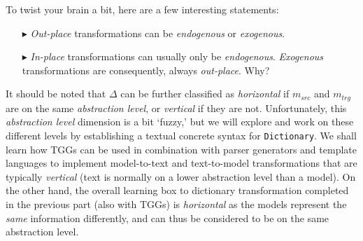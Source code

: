 To twist your brain a bit, here are a few interesting statements:
\begin{enumerate}

\item[$\blacktriangleright$] \emph{Out-place} transformations can be \emph{endogenous} or \emph{exogenous}.

\item[$\blacktriangleright$] \emph{In-place} transformations can usually only be \emph{endogenous}. \emph{Exo\-gen\-ous} transformations are consequently,
always \emph{out-place}.  Why?

\end{enumerate}  

It should be noted that $\Delta$ can be further classified as \emph{horizontal} if $m_{src}$ and $m_{trg}$ are on the same \emph{abstraction level}, or
\emph{vertical} if they are not. Unfortunately, this \emph{abstraction level} dimension is a bit `fuzzy,' but we will explore and work on these different levels
by establishing a textual concrete syntax for \texttt{Dictionary}. We shall learn how TGGs can be used in combination with parser generators
and template languages to implement model-to-text and text-to-model transformations that are typically \emph{vertical} (text is normally on a lower abstraction
level than a model). On the other hand, the overall learning box to dictionary transformation completed in the previous part (also with TGGs) is
\emph{horizontal} as the models represent the \emph{same} information differently, and can thus be considered to be on the same abstraction level.


